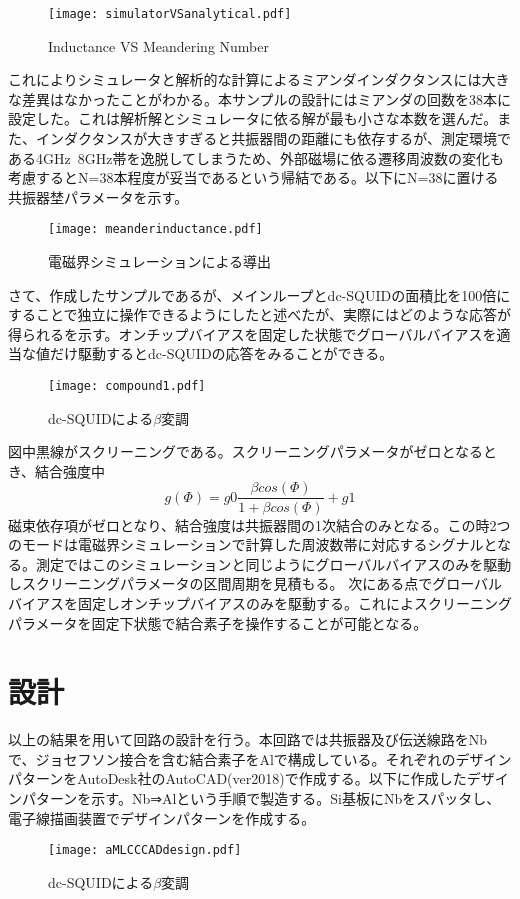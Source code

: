         \begin{figure}[H]
            \centering
            \texttt{[image: simulatorVSanalytical.pdf]}
            \caption{Inductance VS Meandering Number}
        \end{figure}
        これによりシミュレータと解析的な計算によるミアンダインダクタンスには大きな差異はなかったことがわかる。本サンプルの設計にはミアンダの回数を38本に設定した。これは解析解とシミュレータに依る解が最も小さな本数を選んだ。また、インダクタンスが大きすぎると共振器間の距離にも依存するが、測定環境である4GHz~8GHz帯を逸脱してしまうため、外部磁場に依る遷移周波数の変化も考慮するとN=38本程度が妥当であるという帰結である。以下にN=38に置ける共振器埜パラメータを示す。
        \begin{figure}[H]
            \centering
            \texttt{[image: meanderinductance.pdf]}
            \caption{電磁界シミュレーションによる導出}
        \end{figure}
        さて、作成したサンプルであるが、メインループとdc-SQUIDの面積比を100倍にすることで独立に操作できるようにしたと述べたが、実際にはどのような応答が得られるを示す。オンチップバイアスを固定した状態でグローバルバイアスを適当な値だけ駆動するとdc-SQUIDの応答をみることができる。
        \begin{figure}[H]
            \centering
            \texttt{[image: compound1.pdf]}
            \caption{dc-SQUIDによる$\beta$変調}
        \end{figure}
        図中黒線がスクリーニングである。スクリーニングパラメータがゼロとなるとき、結合強度中
        \begin{equation}
            g(\Phi) = g0\frac{\beta cos(\Phi)}{1+\beta cos(\Phi)} + g1
        \end{equation}
        磁束依存項がゼロとなり、結合強度は共振器間の1次結合のみとなる。この時2つのモードは電磁界シミュレーションで計算した周波数帯に対応するシグナルとなる。測定ではこのシミュレーションと同じようにグローバルバイアスのみを駆動しスクリーニングパラメータの区間周期を見積もる。
        次にある点でグローバルバイアスを固定しオンチップバイアスのみを駆動する。これによスクリーニングパラメータを固定下状態で結合素子を操作することが可能となる。

\section{設計}
        以上の結果を用いて回路の設計を行う。本回路では共振器及び伝送線路をNbで、ジョセフソン接合を含む結合素子をAlで構成している。それぞれのデザインパターンをAutoDesk社のAutoCAD(ver2018)で作成する。以下に作成したデザインパターンを示す。Nb⇒Alという手順で製造する。Si基板にNbをスパッタし、電子線描画装置でデザインパターンを作成する。
        \begin{figure}[H]
            \centering
            \texttt{[image: aMLCCCADdesign.pdf]}
            \caption{dc-SQUIDによる$\beta$変調}
        \end{figure}

